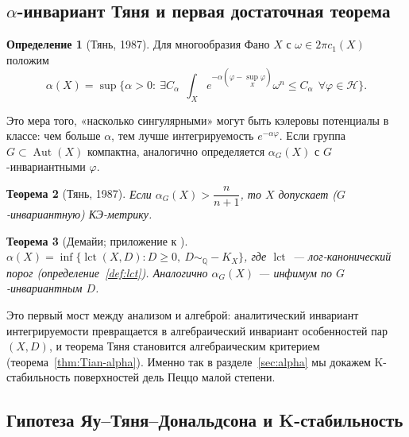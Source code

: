 \documentclass[11pt,a4paper]{article}
\theoremstyle{plain}
\newtheorem{theorem}{Теорема}[section]
\theoremstyle{definition}
\newtheorem{definition}[theorem]{Определение}
\theoremstyle{remark}
\newcommand{\Q}{\mathbb{Q}}
\DeclareMathOperator{\Aut}{Aut}
\DeclareMathOperator{\lct}{lct}
\begin{document}
\subsection{$\alpha$-инвариант Тяня и первая достаточная теорема}

\begin{definition}[Тянь, 1987]\label{def:alpha-analytic}
Для многообразия Фано $X$ с $\omega\in2\pi c_1(X)$ положим
\[
\alpha(X)=\sup\Big\{\alpha>0:\ \exists C_\alpha\ \ \int_Xe^{-\alpha(\varphi-\sup_X\varphi)}\omega^n\le C_\alpha
\ \ \forall\varphi\in\mathcal H\Big\}.
\]
\end{definition}

Это мера того, «насколько сингулярными» могут быть кэлеровы потенциалы в классе: чем больше $\alpha$,
тем лучше интегрируемость $e^{-\alpha\varphi}$. Если группа $G\subset\Aut(X)$ компактна, аналогично
определяется $\alpha_G(X)$ с $G$-инвариантными $\varphi$.

\begin{theorem}[Тянь, 1987]\label{thm:Tian-alpha-analytic}
Если $\alpha_G(X)>\dfrac n{n+1}$, то $X$ допускает ($G$-инвариантную) КЭ-метрику.
\end{theorem}

\begin{theorem}[{Демайи; приложение к \cite{CS08}}]\label{thm:Demailly}
$\alpha(X)=\inf\{\lct(X,D): D\ge0,\ D\sim_\Q-K_X\}$, где $\lct$ --- лог-канонический порог
(определение~\ref{def:lct}). Аналогично $\alpha_G(X)$ --- инфимум по $G$-инвариантным $D$.
\end{theorem}

Это первый мост между анализом и алгеброй: аналитический инвариант интегрируемости превращается
в алгебраический инвариант особенностей пар $(X,D)$, и теорема Тяня становится алгебраическим
критерием (теорема~\ref{thm:Tian-alpha}). Именно так в разделе~\ref{sec:alpha} мы докажем
K-стабильность поверхностей дель Пеццо малой степени.

\subsection{Гипотеза Яу--Тяня--Дональдсона и K-стабильность}
\end{document}
